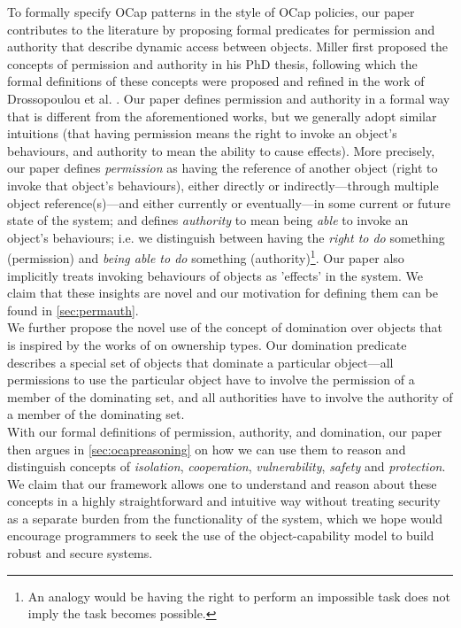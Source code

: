 \documentclass[a4paper,11pt,twoside]{article}
\begin{document}
To formally specify OCap patterns in the style of OCap policies, our paper contributes to the literature by proposing formal predicates for permission and authority that describe dynamic access between objects. Miller first proposed the concepts of permission and authority in his PhD thesis\cite{miller2006}, following which the formal definitions of these concepts were proposed and refined in the work of Drossopoulou et al. \cite{drossopoulou2016}. Our paper defines permission and authority in a formal way that is different from the aforementioned works, but we generally adopt similar intuitions (that having permission means the right to invoke an object's behaviours, and authority to mean the ability to cause effects). More precisely, our paper defines \textit{permission} as having the reference of another object (right to invoke that object's behaviours), either directly or indirectly---through multiple object reference(s)---and either currently or eventually---in some current or future state of the system; and defines \textit{authority} to mean being \textit{able} to invoke an object's behaviours; i.e. we distinguish between having the \textit{right to do} something (permission) and \textit{being able to do} something (authority)\footnote{An analogy would be having the right to perform an impossible task does not imply the task becomes possible.}. Our paper also implicitly treats invoking behaviours of objects as 'effects' in the system. We claim that these insights are novel and our motivation for defining them can be found in \cref{sec:permauth}.\\

We further propose the novel use of the concept of domination over objects that is inspired by the works of \cite{clarke1998} on ownership types. Our domination predicate describes a special set of objects that dominate a particular object---all permissions to use the particular object have to involve the permission of a member of the dominating set, and all authorities have to involve the authority of a member of the dominating set.\\

With our formal definitions of permission, authority, and domination, our paper then argues in \cref{sec:ocapreasoning} on how we can use them to reason and distinguish concepts of \textit{isolation}, \textit{cooperation}, \textit{vulnerability}, \textit{safety} and \textit{protection}. We claim that our framework allows one to understand and reason about these concepts in a highly straightforward and intuitive way without treating security as a separate burden from the functionality of the system, which we hope would encourage programmers to seek the use of the object-capability model to build robust and secure systems.\\
\end{document}
